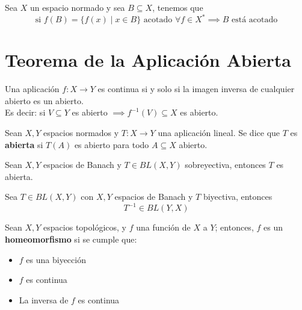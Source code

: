 \documentclass[12pt]{book}
\newcommand{\tbf}{\textbf}
\begin{document}
\begin{coro}
    Sea $X$ un espacio normado y sea $B \subseteq X$, tenemos que
    \begin{equation*}
        \text{si } f(B)=\{f(x) \mid x \in B\} \text{ acotado } \forall f \in X^* \implies B \text{ está acotado}
    \end{equation*}
\end{coro}

\chapter{Teorema de la Aplicación Abierta}

\begin{coro}
    Una aplicación $f: X \longrightarrow Y$ es continua si y solo si la imagen inversa de cualquier abierto es un abierto. \\
    \noindent
    Es decir: si $V \subseteq Y$ es abierto $\implies f^{-1}(V) \subseteq X$ es abierto. \\
\end{coro}

\begin{definicion}
    Sean $X, Y$ espacios normados y $T: X \to Y$ una aplicación lineal. Se dice que $T$ es \textbf{abierta} si $T(A)$ es abierto para todo $A \subseteq X$ abierto. \\
\end{definicion}

\begin{teo}
    Sean $X, Y$ espacios de Banach y $T \in BL(X, Y)$ sobreyectiva, entonces $T$ es abierta.
\end{teo}

\begin{coro}
    Sea $T\in BL(X, Y)$ con $X, Y$ espacios de Banach y $T$ biyectiva, entonces
    $$T^{-1} \in BL(Y, X)$$
\end{coro}

\begin{definicion}

    Sean $X, Y$ espacios topológicos, y $f$ una función de $X$ a $Y$; entonces, $f$ es un \tbf{homeomorfismo} si se cumple que:
    \begin{itemize}
        \item $f$ es una biyección
        \item $f$ es continua
        \item La inversa de $f$ es continua
    \end{itemize}
\end{definicion}
\end{document}
